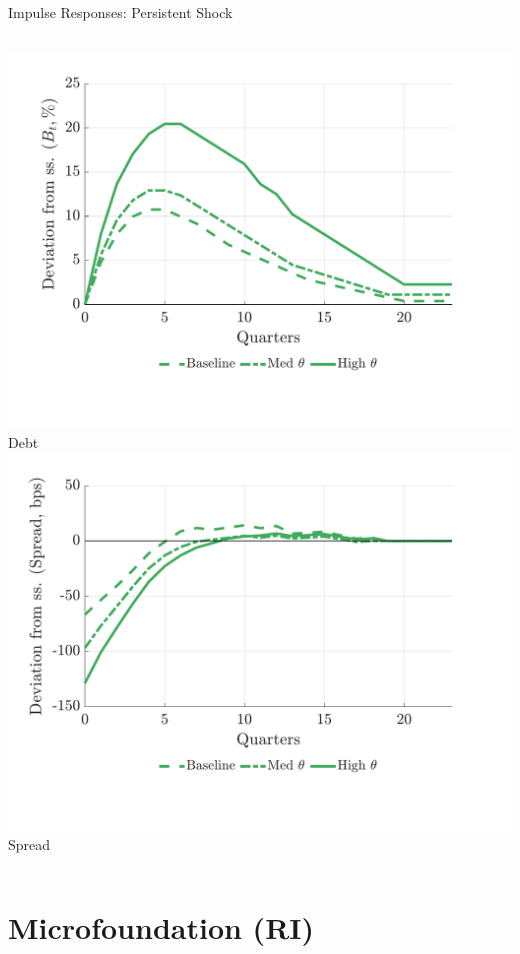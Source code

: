 \documentclass[aspectratio=169,11pt,professionalfonts]{beamer}
\newcommand{\1}{\mathbb{1}}
\begin{document}
\begin{frame}{Impulse Responses: Persistent Shock}
\begin{columns}[T,onlytextwidth]
    \includegraphics[width=\linewidth]{comparison_figure_18.pdf}\\[-0.5em]
    {\scriptsize Debt}
    \includegraphics[width=\linewidth]{comparison_figure_20.pdf}\\[-0.5em]
    {\scriptsize Spread}
  \end{columns}
\end{frame}

\section{Microfoundation (RI)}
\end{document}
